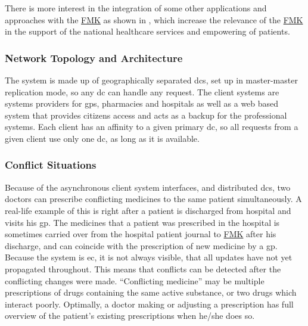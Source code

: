 There is more interest in the integration of some other applications and approaches with the \href{https://www.trifork.com/news/a-prestigious-prize-trifork-public}{FMK} as shown in \cite{Urazimbetov2012a}, which increase the relevance of the \href{https://www.trifork.com/news/a-prestigious-prize-trifork-public}{FMK} in the support of the national healthcare services and empowering of patients.

\subsubsection{Network Topology and Architecture }
The system is made up of geographically separated \glspl{dc}, set up in master-master replication mode, so any \gls{dc} can handle any request. The client systems are systems providers for \glspl{gp}, pharmacies and hospitals as well as a web based system that provides citizens access and acts as a backup for the professional systems. Each client has an affinity to a given primary \gls{dc}, so all requests from a given client use only one \gls{dc}, as long as it is available.


\subsubsection{Conflict Situations}
Because of the asynchronous client system interfaces, and distributed \glspl{dc}, two doctors can prescribe conflicting medicines to the same patient simultaneously. A real-life example of this is right after a patient is discharged from hospital and visits his \gls{gp}. The medicines that a patient was prescribed in the hospital is sometimes carried over from the hospital patient journal to \href{https://www.trifork.com/news/a-prestigious-prize-trifork-public}{FMK} after his discharge, and can coincide with the prescription of new medicine by a \gls{gp}. Because the system is \gls{ec}, it is not always visible, that all updates have not yet propagated throughout. This means that conflicts can be detected after the conflicting changes were made. \textquotedblleft Conflicting medicine\textquotedblright{} may be multiple prescriptions of drugs containing the same active substance, or two drugs which interact poorly. Optimally, a doctor making or adjusting a prescription has full overview of the patient\textquoteright s existing prescriptions when he/she does so.


